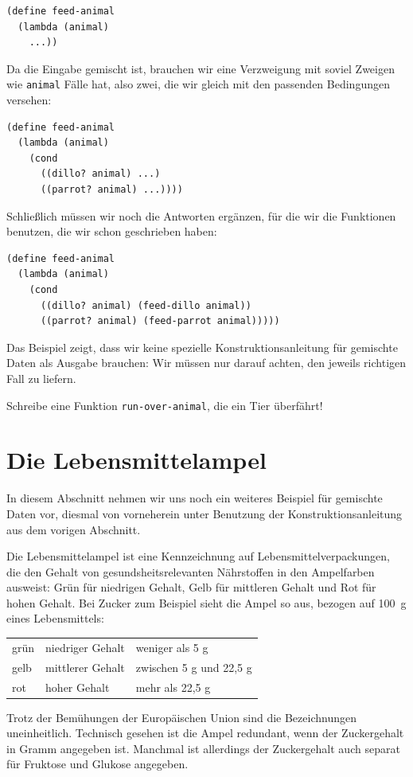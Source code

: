 %
\begin{lstlisting}
(define feed-animal
  (lambda (animal)
    ...))
\end{lstlisting}
%
Da die Eingabe gemischt ist, brauchen wir eine Verzweigung mit soviel
Zweigen wie \lstinline{animal} Fälle hat, also zwei, die wir gleich
mit den passenden Bedingungen versehen:
%
\begin{lstlisting}
(define feed-animal
  (lambda (animal)
    (cond
      ((dillo? animal) ...)
      ((parrot? animal) ...))))
\end{lstlisting}
%
Schließlich müssen wir noch die Antworten ergänzen, für die wir die
Funktionen benutzen, die wir schon geschrieben haben:
%
\begin{lstlisting}
(define feed-animal
  (lambda (animal)
    (cond
      ((dillo? animal) (feed-dillo animal))
      ((parrot? animal) (feed-parrot animal)))))
\end{lstlisting}
%
Das Beispiel zeigt, dass wir keine spezielle Konstruktionsanleitung
für gemischte Daten als Ausgabe brauchen: Wir müssen nur darauf
achten, den jeweils richtigen Fall zu liefern.
%
\begin{aufgabeinline}
  Schreibe eine Funktion \lstinline{run-over-animal}, die ein Tier
  überfährt!
\end{aufgabeinline}

\section{Die Lebensmittelampel}

%
In diesem Abschnitt nehmen wir uns noch ein weiteres Beispiel für
gemischte Daten vor, diesmal von vorneherein unter Benutzung der
Konstruktionsanleitung aus dem vorigen Abschnitt.

Die Lebensmittelampel ist eine Kennzeichnung auf Lebensmittelverpackungen,
die den Gehalt von gesundsheitsrelevanten Nährstoffen in den
Ampelfarben ausweist: Grün für niedrigen Gehalt, Gelb für mittleren Gehalt und
Rot für hohen Gehalt. Bei Zucker zum Beispiel sieht die Ampel so aus, bezogen
auf 100~g eines Lebensmittels:
%
\begin{center}
  \begin{tabular}{l|l|l}
    grün & niedriger Gehalt &  weniger als 5 g\\
    gelb & mittlerer Gehalt & zwischen 5 g und 22,5 g\\
    rot & hoher Gehalt & mehr als 22,5 g
  \end{tabular}
\end{center}
%
Trotz der Bemühungen der Europäischen Union sind die
Bezeichnungen uneinheitlich.  Technisch gesehen ist die Ampel
redundant, wenn der Zuckergehalt in Gramm angegeben ist.
Manchmal ist allerdings der Zuckergehalt auch separat für Fruktose und
Glukose angegeben.

